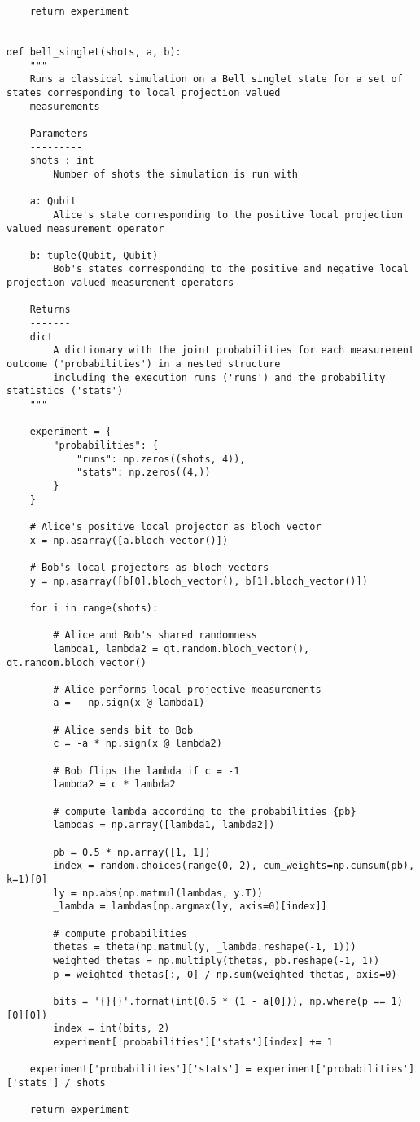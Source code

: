 \begin{verbatim}
    return experiment


def bell_singlet(shots, a, b):
    """
    Runs a classical simulation on a Bell singlet state for a set of states corresponding to local projection valued
    measurements

    Parameters
    ---------
    shots : int
        Number of shots the simulation is run with

    a: Qubit
        Alice's state corresponding to the positive local projection valued measurement operator

    b: tuple(Qubit, Qubit)
        Bob's states corresponding to the positive and negative local projection valued measurement operators

    Returns
    -------
    dict
        A dictionary with the joint probabilities for each measurement outcome ('probabilities') in a nested structure
        including the execution runs ('runs') and the probability statistics ('stats')
    """

    experiment = {
        "probabilities": {
            "runs": np.zeros((shots, 4)),
            "stats": np.zeros((4,))
        }
    }

    # Alice's positive local projector as bloch vector
    x = np.asarray([a.bloch_vector()])

    # Bob's local projectors as bloch vectors
    y = np.asarray([b[0].bloch_vector(), b[1].bloch_vector()])

    for i in range(shots):

        # Alice and Bob's shared randomness
        lambda1, lambda2 = qt.random.bloch_vector(), qt.random.bloch_vector()

        # Alice performs local projective measurements
        a = - np.sign(x @ lambda1)

        # Alice sends bit to Bob
        c = -a * np.sign(x @ lambda2)

        # Bob flips the lambda if c = -1
        lambda2 = c * lambda2

        # compute lambda according to the probabilities {pb}
        lambdas = np.array([lambda1, lambda2])

        pb = 0.5 * np.array([1, 1])
        index = random.choices(range(0, 2), cum_weights=np.cumsum(pb), k=1)[0]
        ly = np.abs(np.matmul(lambdas, y.T))
        _lambda = lambdas[np.argmax(ly, axis=0)[index]]

        # compute probabilities
        thetas = theta(np.matmul(y, _lambda.reshape(-1, 1)))
        weighted_thetas = np.multiply(thetas, pb.reshape(-1, 1))
        p = weighted_thetas[:, 0] / np.sum(weighted_thetas, axis=0)

        bits = '{}{}'.format(int(0.5 * (1 - a[0])), np.where(p == 1)[0][0])
        index = int(bits, 2)
        experiment['probabilities']['stats'][index] += 1

    experiment['probabilities']['stats'] = experiment['probabilities']['stats'] / shots

    return experiment
\end{verbatim}
\newpage
